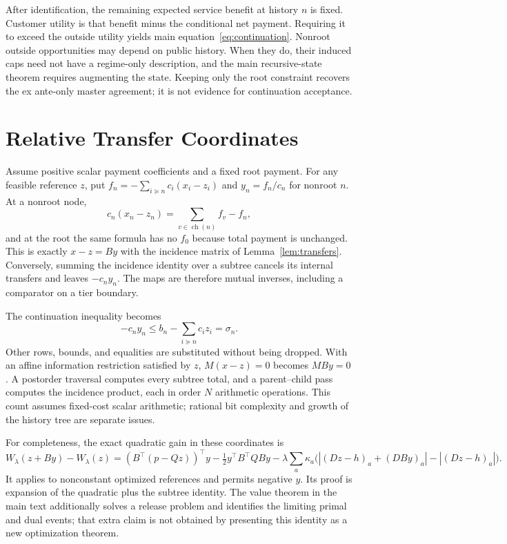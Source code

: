 \documentclass[11pt,letterpaper]{article}
\theoremstyle{definition}\newtheorem{remark}[theorem]{Remark}
\begin{document}
After identification, the remaining expected service benefit at history $n$ is fixed. Customer utility is that benefit minus the conditional net payment. Requiring it to exceed the outside utility yields main equation~\eqref{eq:continuation}. Nonroot outside opportunities may depend on public history. When they do, their induced caps need not have a regime-only description, and the main recursive-state theorem requires augmenting the state. Keeping only the root constraint recovers the ex ante-only master agreement; it is not evidence for continuation acceptance.

\section{Relative Transfer Coordinates}\label{ec:transfer}
Assume positive scalar payment coefficients and a fixed root payment. For any feasible reference $z$, put
$f_n=-\sum_{i\succeq n}c_i(x_i-z_i)$ and $y_n=f_n/c_n$ for nonroot $n$. At a nonroot node,
\[
 c_n(x_n-z_n)=\sum_{v\in\operatorname{ch}(n)}f_v-f_n,
\]
and at the root the same formula has no $f_0$ because total payment is unchanged. This is exactly $x-z=By$ with the incidence matrix of Lemma~\ref{lem:transfers}. Conversely, summing the incidence identity over a subtree cancels its internal transfers and leaves $-c_ny_n$. The maps are therefore mutual inverses, including a comparator on a tier boundary.

The continuation inequality becomes
\[
 -c_n y_n\leq b_n-\sum_{i\succeq n}c_i z_i=\sigma_n.
\]
Other rows, bounds, and equalities are substituted without being dropped. With an affine information restriction satisfied by $z$, $M(x-z)=0$ becomes $MBy=0$. A postorder traversal computes every subtree total, and a parent--child pass computes the incidence product, each in order $N$ arithmetic operations. This count assumes fixed-cost scalar arithmetic; rational bit complexity and growth of the history tree are separate issues.

For completeness, the exact quadratic gain in these coordinates is
\[
 W_\lambda(z+By)-W_\lambda(z)
 =(B^\top(p-Qz))^\top y-\tfrac12y^\top B^\top QB y
 -\lambda\sum_a\kappa_a\bigl(|(Dz-h)_a+(DBy)_a|-|(Dz-h)_a|\bigr).
\]
It applies to nonconstant optimized references and permits negative $y$. Its proof is expansion of the quadratic plus the subtree identity. The value theorem in the main text additionally solves a release problem and identifies the limiting primal and dual events; that extra claim is not obtained by presenting this identity as a new optimization theorem.
\end{document}
